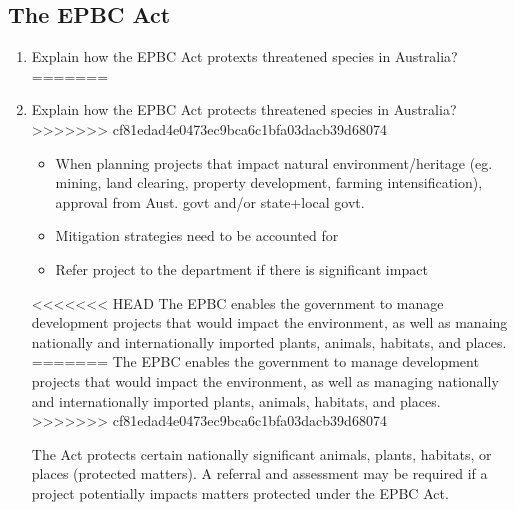 	\subsection{The EPBC Act}
		\begin{enumerate}
<<<<<<< HEAD
			\item Explain how the EPBC Act protexts threatened species in Australia?
=======
			\item Explain how the EPBC Act protects threatened species in Australia?
>>>>>>> cf81edad4e0473ec9bca6c1bfa03dacb39d68074
				\begin{itemize}
					\item When planning projects that impact natural environment/heritage (eg. mining, land clearing, property development, farming intensification), approval from Aust. govt and/or state+local govt.
					\item Mitigation strategies need to be accounted for
					\item Refer project to the department if there is significant impact
				\end{itemize}
<<<<<<< HEAD
				\subitem The EPBC enables the government to manage development projects that would impact the environment, as well as manaing nationally and internationally imported plants, animals, habitats, and places.
=======
				\subitem The EPBC enables the government to manage development projects that would impact the environment, as well as managing nationally and internationally imported plants, animals, habitats, and places.
>>>>>>> cf81edad4e0473ec9bca6c1bfa03dacb39d68074
				
				The Act protects certain nationally significant animals, plants, habitats, or places (protected matters). A referral and assessment may be required if a project potentially impacts matters protected under the EPBC Act.


\end{enumerate}
